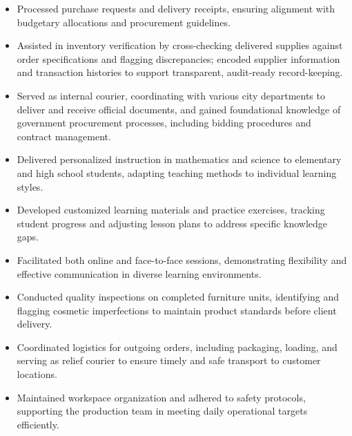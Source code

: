 \documentclass[10pt,a4paper]{article}
\begin{document}
\begin{itemize}
    \item Processed purchase requests and delivery receipts, ensuring alignment with budgetary allocations and procurement guidelines.
    \item Assisted in inventory verification by cross-checking delivered supplies against order specifications and flagging discrepancies; encoded supplier information and transaction histories to support transparent, audit-ready record-keeping.
    \item Served as internal courier, coordinating with various city departments to deliver and receive official documents, and gained foundational knowledge of government procurement processes, including bidding procedures and contract management.
\end{itemize}

\begin{itemize}
    \item Delivered personalized instruction in mathematics and science to elementary and high school students, adapting teaching methods to individual learning styles.
    \item Developed customized learning materials and practice exercises, tracking student progress and adjusting lesson plans to address specific knowledge gaps.
    \item Facilitated both online and face-to-face sessions, demonstrating flexibility and effective communication in diverse learning environments.
\end{itemize}

\begin{itemize}
    \item Conducted quality inspections on completed furniture units, identifying and flagging cosmetic imperfections to maintain product standards before client delivery.
    \item Coordinated logistics for outgoing orders, including packaging, loading, and serving as relief courier to ensure timely and safe transport to customer locations.
    \item Maintained workspace organization and adhered to safety protocols, supporting the production team in meeting daily operational targets efficiently.
\end{itemize}
\end{document}
